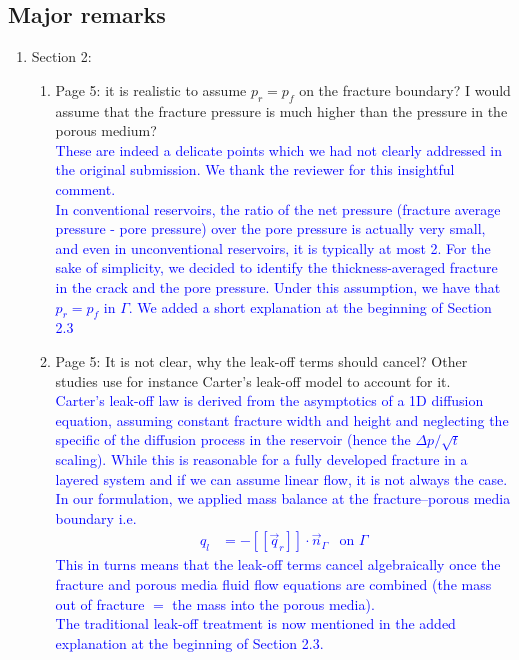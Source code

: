 \documentclass{article}
\newcommand{\AuthCom}[1]{\textcolor{blue}{#1}}
\begin{document}
\subsection*{Major remarks}
\begin{enumerate}
\item Section 2: 
\begin{enumerate}
	\item Page 5: it is realistic to assume $p_r = p_f$ on the fracture boundary? I would assume that the fracture pressure is much higher than the pressure in the porous medium? \\
	\AuthCom{These are indeed a delicate points which we had not clearly addressed in the original submission. We thank the reviewer for this insightful comment.\\
	In conventional reservoirs, the ratio of the net pressure (fracture average pressure - pore pressure) over the pore pressure is actually very small, and even in unconventional reservoirs, it is typically at most 2.  
	For the sake of simplicity, we decided to identify the thickness-averaged fracture in the crack and the pore pressure.
	Under this assumption, we have that $p_r = p_f$ in $\Gamma$.
	We added a short explanation at the beginning of Section 2.3}
	\item Page 5: It is not clear, why the leak-off terms should cancel? Other studies use for instance Carter's leak-off model to account for it. \\
	\AuthCom{
	Carter's leak-off law is derived from the asymptotics of a 1D diffusion equation, assuming constant fracture width and height and neglecting the specific of the diffusion process in the reservoir (hence the $\Delta p / \sqrt{t}$ scaling).
	While this is reasonable for a fully developed fracture in a layered system and if we can assume linear flow, it is not always the case. \\
	In our formulation, we applied mass balance at the fracture--porous media boundary i.e.
	\begin{align}
	\label{leakoffequation}
	q_l &= -[\![\vec{q}_r]\!]\cdot\vec{n}_{\Gamma}	& \text{on }  \Gamma
	\end{align}
	This in turns means that the leak-off terms cancel algebraically once the fracture and porous media fluid flow equations are combined (the mass out of fracture $=$ the mass into the porous media).\\
	The traditional leak-off treatment is now mentioned in the added explanation at the beginning of Section 2.3.
}



\end{enumerate}
\end{enumerate}
\end{document}
